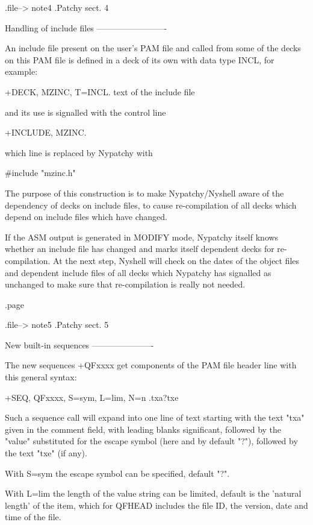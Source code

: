 .file-->  note4
.Patchy sect. 4





                 Handling of include files
                 -------------------------




An include file present on the user's PAM file and called from some
of the decks on this PAM file is defined in a deck of its own with
data type INCL, for example:

      +DECK, MZINC, T=INCL.
      text of the include file

and its use is signalled with the control line

      +INCLUDE, MZINC.

which line is replaced by Nypatchy with

      #include "mzinc.h"


The purpose of this construction is to make Nypatchy/Nyshell aware
of the dependency of decks on include files, to cause re-compilation
of all decks which depend on include files which have changed.

If the ASM output is generated in MODIFY mode, Nypatchy itself
knows whether an include file has changed and marks itself dependent
decks for re-compilation. At the next step, Nyshell will check on
the dates of the object files and dependent include files of all
decks which Nypatchy has signalled as unchanged to make sure that
re-compilation is really not needed.



.page


.file-->  note5
.Patchy sect. 5

                   New built-in sequences
                   ----------------------

The new sequences +QFxxxx get components of the PAM file header
line with this general syntax:

   +SEQ, QFxxxx, S=sym, L=lim, N=n  .txa?txe

Such a sequence call will expand into one line of text starting
with the text "txa" given in the comment field, with leading
blanks significant, followed by the "value" substituted for the
escape symbol (here and by default "?"), followed by the text
"txe" (if any).

   With S=sym the escape symbol can be specified, default "?".

   With L=lim the length of the value string can be limited,
   default is the 'natural length' of the item, which for QFHEAD
   includes the file ID, the version, date and time of the file.

